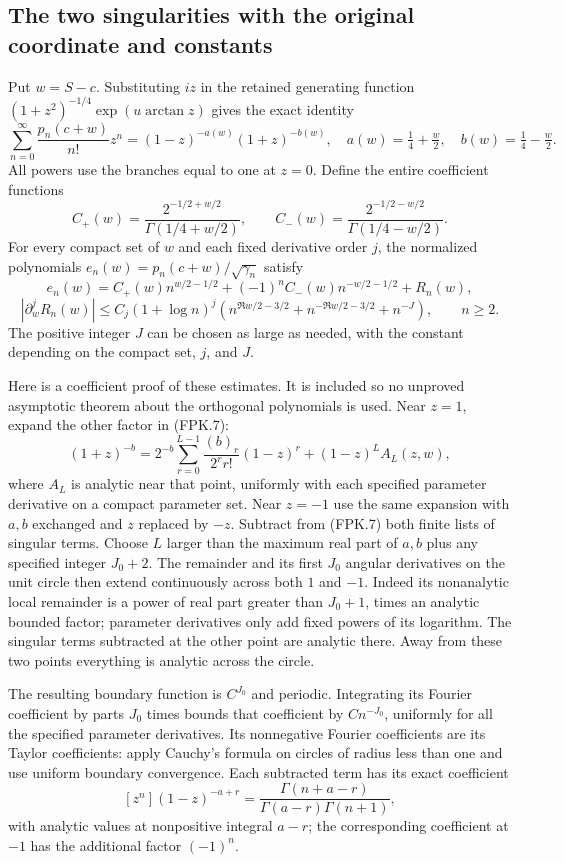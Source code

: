 \documentclass[11pt,a4paper]{article}
\begin{document}
\subsection{The two singularities with the original coordinate and constants}

Put $w=S-c$. Substituting $iz$ in the retained generating function
$(1+z^2)^{-1/4}\exp(u\arctan z)$ gives the exact identity
\[
 \sum_{n=0}^\infty \frac{p_n(c+w)}{n!}z^n
    =(1-z)^{-a(w)}(1+z)^{-b(w)},
 \quad a(w)=\tfrac14+\tfrac w2,
 \quad b(w)=\tfrac14-\tfrac w2.
 \tag{FPK.7}
\]
All powers use the branches equal to one at $z=0$. Define the entire
coefficient functions
\[
 C_+(w)=\frac{2^{-1/2+w/2}}{\Gamma(1/4+w/2)},\qquad
 C_-(w)=\frac{2^{-1/2-w/2}}{\Gamma(1/4-w/2)}.
 \tag{FPK.8}
\]
For every compact set of $w$ and each fixed derivative order $j$,
the normalized polynomials $e_n(w)=p_n(c+w)/\sqrt{\gamma_n}$ satisfy
\[
 e_n(w)=C_+(w)n^{w/2-1/2}
           +(-1)^n C_-(w)n^{-w/2-1/2}+R_n(w),
 \tag{FPK.9}
\]
\[
 |\partial_w^jR_n(w)|
 \leq C_j(1+\log n)^j
       \left(n^{\Re w/2-3/2}+n^{-\Re w/2-3/2}
                         +n^{-J}\right),\qquad n\geq2.
 \tag{FPK.10}
\]
The positive integer $J$ can be chosen as large as needed, with the
constant depending on the compact set, $j$, and $J$.

Here is a coefficient proof of these estimates. It is included so no
unproved asymptotic theorem about the orthogonal polynomials is used.
Near $z=1$, expand the other factor in (FPK.7):
\[
 (1+z)^{-b}=2^{-b}
   \sum_{r=0}^{L-1}\frac{(b)_r}{2^r r!}(1-z)^r
            +(1-z)^L A_L(z,w),
 \tag{FPK.11}
\]
where $A_L$ is analytic near that point, uniformly with each specified
parameter derivative on a compact parameter set. Near $z=-1$ use the
same expansion with $a,b$ exchanged and $z$ replaced by $-z$.
Subtract from (FPK.7) both finite lists of singular terms. Choose $L$
larger than the maximum real part of $a,b$ plus any specified integer
$J_0+2$. The remainder and its first $J_0$ angular derivatives on the
unit circle then extend continuously across both $1$ and $-1$.
Indeed its nonanalytic local remainder is a power of real part greater
than $J_0+1$, times an analytic bounded factor; parameter derivatives
only add fixed powers of its logarithm. The singular terms subtracted
at the other point are analytic there. Away from these two points
everything is analytic across the circle.

The resulting boundary function is $C^{J_0}$ and periodic. Integrating
its Fourier coefficient by parts $J_0$ times bounds that coefficient
by $C n^{-J_0}$, uniformly for all the specified parameter derivatives.
Its nonnegative Fourier coefficients are its Taylor coefficients:
apply Cauchy's formula on circles of radius less than one and use
uniform boundary convergence. Each subtracted term has its exact
coefficient
\[
 [z^n](1-z)^{-a+r}
   =\frac{\Gamma(n+a-r)}{\Gamma(a-r)\Gamma(n+1)},
 \tag{FPK.12}
\]
with analytic values at nonpositive integral $a-r$; the corresponding
coefficient at $-1$ has the additional factor $(-1)^n$.
\end{document}
